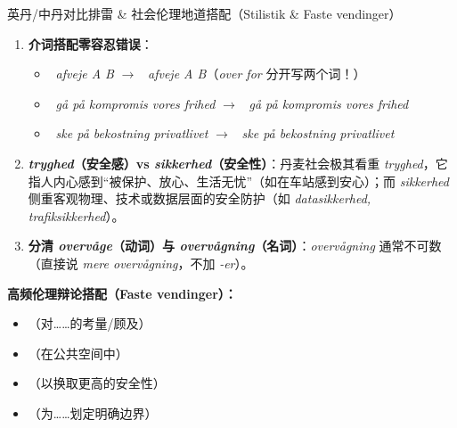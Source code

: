 \begin{grammatikbox}{英丹/中丹对比排雷 \& 社会伦理地道搭配（Stilistik \& Faste vendinger）}
\begin{enumerate}
  \item \textbf{介词搭配零容忍错误}：
    \begin{itemize}
      \item {}\ \textit{afveje A  B} $\rightarrow$ \ \textit{afveje A  B}（\textit{over for} 分开写两个词！）
      \item {}\ \textit{gå på kompromis  vores frihed} $\rightarrow$ \ \textit{gå på kompromis  vores frihed}
      \item {}\ \textit{ske på bekostning  privatlivet} $\rightarrow$ \ \textit{ske på bekostning  privatlivet}
    \end{itemize}
  \item \textbf{\textit{tryghed}（安全感）vs \textit{sikkerhed}（安全性）}：丹麦社会极其看重 \textit{tryghed}，它指人内心感到“被保护、放心、生活无忧”（如在车站感到安心）；而 \textit{sikkerhed} 侧重客观物理、技术或数据层面的安全防护（如 \textit{datasikkerhed, trafiksikkerhed}）。
  \item \textbf{分清 \textit{overvåge}（动词）与 \textit{overvågning}（名词）}：\textit{overvågning} 通常不可数（直接说 \textit{mere overvågning}，不加 \textit{-er}）。
\end{enumerate}

\textbf{高频伦理辩论搭配（Faste vendinger）：}
\begin{itemize}
  \item {}（对……的考量/顾及）
  \item {}（在公共空间中）
  \item {}（以换取更高的安全性）
  \item {}（为……划定明确边界）
\end{itemize}
\end{grammatikbox}


